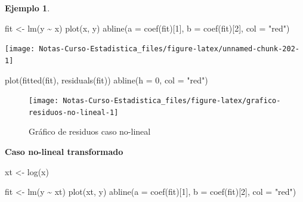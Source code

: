 \documentclass[
  12pt,
]{book}
\newenvironment{Shaded}{\begin{snugshade}}{\end{snugshade}}
\newcommand{\AttributeTok}[1]{\textcolor[rgb]{0.77,0.63,0.00}{#1}}
\newcommand{\DecValTok}[1]{\textcolor[rgb]{0.00,0.00,0.81}{#1}}
\newcommand{\FunctionTok}[1]{\textcolor[rgb]{0.00,0.00,0.00}{#1}}
\newcommand{\NormalTok}[1]{#1}
\newcommand{\OtherTok}[1]{\textcolor[rgb]{0.56,0.35,0.01}{#1}}
\newcommand{\SpecialCharTok}[1]{\textcolor[rgb]{0.00,0.00,0.00}{#1}}
\newcommand{\StringTok}[1]{\textcolor[rgb]{0.31,0.60,0.02}{#1}}
\theoremstyle{definition}
\theoremstyle{definition}
\newtheorem{example}{Ejemplo}[chapter]
\theoremstyle{definition}
\theoremstyle{remark}
\begin{document}
\begin{example}
\begin{Shaded}
\begin{Highlighting}[]
\NormalTok{fit }\OtherTok{\textless{}{-}} \FunctionTok{lm}\NormalTok{(y }\SpecialCharTok{\textasciitilde{}}\NormalTok{ x)}
\FunctionTok{plot}\NormalTok{(x, y)}
\FunctionTok{abline}\NormalTok{(}\AttributeTok{a =} \FunctionTok{coef}\NormalTok{(fit)[}\DecValTok{1}\NormalTok{], }\AttributeTok{b =} \FunctionTok{coef}\NormalTok{(fit)[}\DecValTok{2}\NormalTok{], }\AttributeTok{col =} \StringTok{"red"}\NormalTok{)}
\end{Highlighting}
\end{Shaded}

\begin{center}\texttt{[image: Notas-Curso-Estadistica\_files/figure-latex/unnamed-chunk-202-1]} \end{center}

\begin{Shaded}
\begin{Highlighting}[]
\FunctionTok{plot}\NormalTok{(}\FunctionTok{fitted}\NormalTok{(fit), }\FunctionTok{residuals}\NormalTok{(fit))}
\FunctionTok{abline}\NormalTok{(}\AttributeTok{h =} \DecValTok{0}\NormalTok{, }\AttributeTok{col =} \StringTok{"red"}\NormalTok{)}
\end{Highlighting}
\end{Shaded}

\begin{figure}

{\centering \texttt{[image: Notas-Curso-Estadistica\_files/figure-latex/grafico-residuos-no-lineal-1]} 

}

\caption{Gráfico de residuos caso no-lineal}\label{fig:grafico-residuos-no-lineal}
\end{figure}

\textbf{Caso no-lineal transformado}

\begin{Shaded}
\begin{Highlighting}[]
\NormalTok{xt }\OtherTok{\textless{}{-}} \FunctionTok{log}\NormalTok{(x)}


\NormalTok{fit }\OtherTok{\textless{}{-}} \FunctionTok{lm}\NormalTok{(y }\SpecialCharTok{\textasciitilde{}}\NormalTok{ xt)}
\FunctionTok{plot}\NormalTok{(xt, y)}
\FunctionTok{abline}\NormalTok{(}\AttributeTok{a =} \FunctionTok{coef}\NormalTok{(fit)[}\DecValTok{1}\NormalTok{], }\AttributeTok{b =} \FunctionTok{coef}\NormalTok{(fit)[}\DecValTok{2}\NormalTok{], }\AttributeTok{col =} \StringTok{"red"}\NormalTok{)}
\end{Highlighting}
\end{Shaded}


\end{example}
\end{document}

